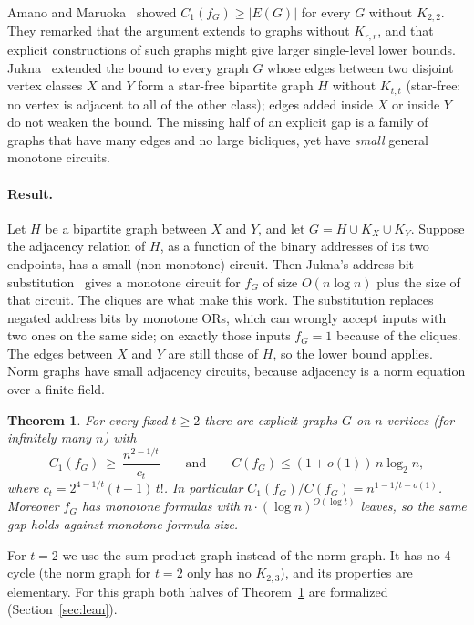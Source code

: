 \documentclass[11pt]{article}
\newtheorem{theorem}{Theorem}
\theoremstyle{definition}
\theoremstyle{remark}
\newcommand{\Cone}{C_1}
\newcommand{\Csize}{C}
\begin{document}
Amano and Maruoka~\cite{AM06} showed $\Cone(f_G)\ge|E(G)|$ for every $G$ without $K_{2,2}$. They remarked that the
argument extends to graphs without $K_{r,r}$, and that explicit constructions of such graphs might give larger
single-level lower bounds. Jukna~\cite[Lemma~3.13]{Juk06} extended the bound to every graph $G$ whose edges
between two disjoint vertex classes $X$ and $Y$ form a star-free bipartite graph $H$ without $K_{t,t}$ (star-free: no
vertex is adjacent to all of the other class); edges added inside $X$ or
inside $Y$ do not weaken the bound. The missing half of an explicit gap is a family of graphs that have many edges and
no large bicliques, yet have \emph{small} general monotone circuits.

\paragraph{Result.} Let $H$ be a bipartite graph between $X$ and $Y$, and let $G=H\cup K_X\cup K_Y$. Suppose the
adjacency relation of $H$, as a function of the binary addresses of its two endpoints, has a small (non-monotone)
circuit. Then Jukna's address-bit substitution~\cite{Juk06} gives a monotone circuit for $f_G$ of size $O(n\log n)$
plus the size of that circuit. The cliques are what make this work. The substitution replaces negated address bits by
monotone ORs, which can wrongly accept inputs with two ones on the same side; on exactly those inputs $f_G=1$ because of
the cliques. The edges between $X$ and $Y$ are still those of $H$, so the lower bound applies. Norm graphs have small
adjacency circuits, because adjacency is a norm equation over a finite field.

\begin{theorem}\label{thm:main}
For every fixed $t\ge 2$ there are explicit graphs $G$ on $n$ vertices (for infinitely many $n$) with
\[
\Cone(f_G)\ \ge\ \frac{n^{2-1/t}}{c_t}\qquad\text{and}\qquad \Csize(f_G)\le (1+o(1))\, n\log_2 n ,
\]
where $c_t=2^{4-1/t}(t-1)\,t!$. In particular $\Cone(f_G)/\Csize(f_G)=n^{1-1/t-o(1)}$. Moreover $f_G$ has monotone
formulas with $n\cdot(\log n)^{O(\log t)}$ leaves, so the same gap holds against monotone formula size.
\end{theorem}

For $t=2$ we use the sum-product graph instead of the norm graph. It has no 4-cycle (the norm graph for $t=2$ only has
no $K_{2,3}$), and its properties are elementary. For this graph both halves of Theorem~\ref{thm:main} are formalized
(Section~\ref{sec:lean}).
\end{document}
